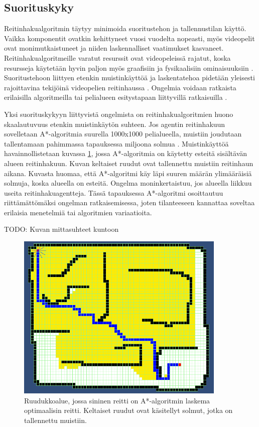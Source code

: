 \documentclass[utf8]{gradu3}
\begin{document}
\subsection{Suorituskyky}

Reitinhakualgoritmin täytyy minimoida suoritustehon ja tallennustilan käyttö. Vaikka komponentit ovatkin kehittyneet vuosi vuodelta nopeasti, myös videopelit ovat monimutkaistuneet ja niiden laskennalliset vaatimukset kasvaneet. Reitinhakualgoritmeille varatut resurssit ovat videopeleissä rajatut, koska resursseja käytetään hyvin paljon myös graafisiin ja fysikaalisiin ominaisuuksiin \parencite{lawande2022systematic}. Suoritustehoon liittyen etenkin muistinkäyttöä ja laskentatehoa pidetään yleisesti rajoittavina tekijöinä videopelien reitinhaussa \parencite{botea2013pathfinding}. Ongelmia voidaan ratkaista erilaisilla algoritmeilla tai pelialueen esitystapaan liittyvillä ratkaisuilla \parencite{botea2013pathfinding,cui2011based}.

Yksi suorituskykyyn liittyvistä ongelmista on reitinhakualgoritmien huono skaalautuvuus etenkin muistinkäytön suhteen. Jos agentin reitinhakuun sovelletaan A*-algoritmia suurella 1000x1000 pelialueella, muistiin joudutaan tallentamaan pahimmassa tapauksessa miljoona solmua \parencite{cui2011based,duchovn2014path}. Muistinkäyttöä havainnollistetaan kuvassa \ref{astarmemory}, jossa A*-algoritmia on käytetty esteitä sisältävän alueen reitinhakuun. Kuvan keltaiset ruudut ovat tallennettu muistiin reitinhaun aikana. Kuvasta huomaa, että A*-algoritmi käy läpi suuren määrän ylimääräisiä solmuja, koska alueella on esteitä. Ongelma moninkertaistuu, jos alueella liikkuu useita reitinhakuagentteja. Tässä tapauksessa A*-algoritmi osoittautuu riittämättömäksi ongelman ratkaisemisessa, joten tilanteeseen kannattaa soveltaa erilaisia menetelmiä tai algoritmien variaatioita.

TODO: Kuvan mittasuhteet kuntoon

\begin{figure}[h]
\centering
\includegraphics[width=10cm]{a_star_memory.png}
\caption{Ruudukkoalue, jossa sininen reitti on A*-algoritmin laskema optimaalisin reitti. Keltaiset ruudut ovat käsitellyt solmut, jotka on tallennettu muistiin.}
\label{astarmemory}
\end{figure}
\end{document}
